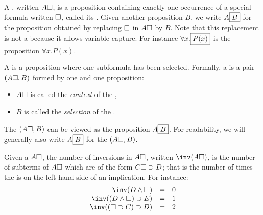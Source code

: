 
\begin{scope}

\begin{definition}[Context]

  A , written $A\square$, is a proposition containing exactly one
  occurrence of a special formula written $\square$, called its .
  Given another proposition $B$, we write $A\fbox{$B$}$ for the proposition
  obtained by replacing $\square$ in $A\square$ by $B$. Note that this replacement
  is not a  because it allows variable capture. For instance
  $\forall x.\fbox{$P(x)$}$ is the proposition $\forall x.P(x)$.
\end{definition}

\begin{definition}[Path]
A  is a proposition where one subformula has been
selected. Formally, a  is a pair $(A\square, B)$ formed by one
 and one proposition:
\begin{itemize}
\item $A\square$ is called the {\em context} of the ,
\item $B$ is called the {\em selection} of the .
\end{itemize}

The  $(A\square, B)$ can be viewed as the proposition
$A\fbox{$B$}$.  For readability, we will generally also write
$A\fbox{$B$}$ for the  $(A\square, B)$.
\end{definition}

\begin{definition}[Inversions]
  Given a  $A\square$, the number of inversions in $A\square$,
  written $\inv(A\hole)$, is the number of subterms of $A\square$
  which are of the form $C\square\supset D$; that is the number of
  times the  is on the left-hand side of an implication.
  For instance:
  $$
  \begin{array}{rcl}
      \inv(D\land \hole)&=& 0\\
      \inv((D\land \hole)\limp E)&=&1\\
      \inv((\hole\limp C)\limp D) &=& 2
  \end{array}
  $$
\end{definition}


\end{scope}
